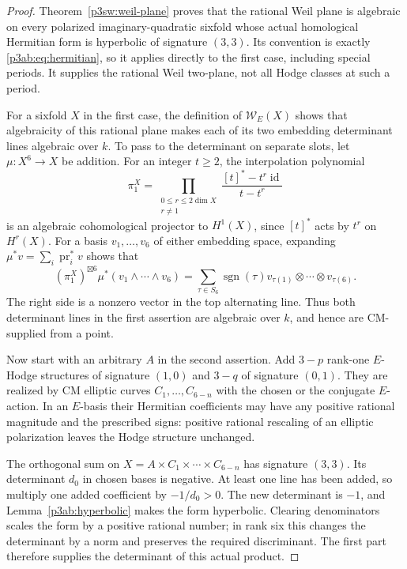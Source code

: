 \documentclass[11pt]{article}
\numberwithin{equation}{section}
\begin{document}
\begin{proof}
Theorem~\ref{p3sw:weil-plane} proves that the rational Weil plane is
algebraic on every polarized imaginary-quadratic sixfold whose actual
homological Hermitian form is hyperbolic of signature \((3,3)\).
Its convention is exactly \eqref{p3ab:eq:hermitian}, so it applies directly
to the first case, including special periods.  It supplies the rational
Weil two-plane, not all Hodge classes at such a period.

For a sixfold \(X\) in the first case, the definition of
\(\mathcal W_E(X)\) shows that algebraicity of this
rational plane makes each of its two embedding determinant lines
algebraic over \(k\).  To pass to the
determinant on separate slots, let \(\mu:X^6\to X\) be addition.
For an integer \(t\geq2\), the interpolation polynomial
\[
 \pi_1^X=
 \prod_{\substack{0\leq r\leq2\dim X\\ r\ne1}}
 \frac{[t]^*-t^r\operatorname{id}}{t-t^r}
\]
is an algebraic cohomological projector to \(H^1(X)\), since
\([t]^*\) acts by \(t^r\) on \(H^r(X)\).  For a basis
\(v_1,\ldots,v_6\) of either embedding space, expanding
\(\mu^*v=\sum_i\operatorname{pr}_i^*v\) shows that
\[
 (\pi_1^X)^{\boxtimes6}\mu^*
 (v_1\wedge\cdots\wedge v_6)
 =
 \sum_{\tau\in S_6}\operatorname{sgn}(\tau)
 v_{\tau(1)}\otimes\cdots\otimes v_{\tau(6)}.
\]
The right side is a nonzero vector in the top alternating line.
Thus both determinant lines in the first assertion are algebraic
over \(k\), and hence are CM-supplied from a point.

Now start with an arbitrary \(A\) in the second assertion.  Add
\(3-p\) rank-one \(E\)-Hodge structures of signature \((1,0)\)
and \(3-q\) of signature \((0,1)\).  They are realized by CM
elliptic curves \(C_1,\ldots,C_{6-n}\) with the chosen or the
conjugate \(E\)-action.  In an \(E\)-basis their Hermitian
coefficients may have any positive rational magnitude and the
prescribed signs: positive rational rescaling of an elliptic
polarization leaves the Hodge structure unchanged.

The orthogonal sum on
\(X=A\times C_1\times\cdots\times C_{6-n}\) has signature
\((3,3)\).  Its determinant \(d_0\) in chosen bases is negative.
At least one line has been added, so multiply one added coefficient
by \(-1/d_0>0\).  The new determinant is \(-1\), and
Lemma~\ref{p3ab:hyperbolic} makes the form hyperbolic.  Clearing
denominators scales the form by a positive rational number; in rank
six this changes the determinant by a norm and preserves the required
discriminant.  The first part therefore supplies the determinant of
this actual product.


\end{proof}
\end{document}
